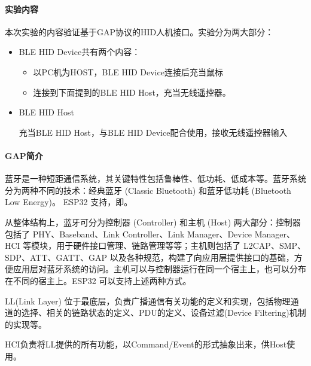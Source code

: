 \documentclass[a4paper,12pt,english]{sphinxmanual}
\begin{document}
{{\paragraph{实验内容}
\label{\detokenize{exp-esp32/bluetooth/hid-gap:id1}}
\sphinxAtStartPar
本次实验的内容验证基于GAP协议的HID人机接口。实验分为两大部分：
\begin{itemize}
\item {} 
\sphinxAtStartPar
BLE HID Device共有两个内容：
\begin{itemize}
\item {} 
\sphinxAtStartPar
以PC机为HOST，BLE HID Device连接后充当鼠标

\item {} 
\sphinxAtStartPar
连接到下面提到的BLE HID Host，充当无线遥控器。

\end{itemize}

\item {} 
\sphinxAtStartPar
BLE HID Host

\sphinxAtStartPar
充当BLE HID Host，与BLE HID Device配合使用，接收无线遥控器输入

\end{itemize}


\paragraph{GAP简介}
\label{\detokenize{exp-esp32/bluetooth/hid-gap:gap}}
\sphinxAtStartPar
蓝牙是⼀种短距通信系统，其关键特性包括鲁棒性、低功耗、低成本等。蓝牙系统分为两种不同的技术：经典蓝牙 (Classic Bluetooth) 和蓝牙低功耗 (Bluetooth Low Energy)。
ESP32 支持，即。

\sphinxAtStartPar
从整体结构上，蓝牙可分为控制器 (Controller) 和主机 (Host) 两⼤部分：控制器包括了 PHY、Baseband、Link Controller、Link Manager、Device Manager、HCI 等模块，用于硬件接⼝管理、链路管理等等；主机则包括了 L2CAP、SMP、SDP、ATT、GATT、GAP 以及各种规范，构建了向应用层提供接口的基础，方便应用层对蓝牙系统的访问。主机可以与控制器运行在同⼀个宿主上，也可以分布在不同的宿主上。ESP32 可以支持上述两种方式。

\sphinxAtStartPar
LL(Link Layer) 位于最底层，负责广播通信有关功能的定义和实现，包括物理通道的选择、相关的链路状态的定义、PDU的定义、设备过滤(Device Filtering)机制的实现等。

\sphinxAtStartPar
HCI负责将LL提供的所有功能，以Command/Event的形式抽象出来，供Host使用。

}}
\end{document}
